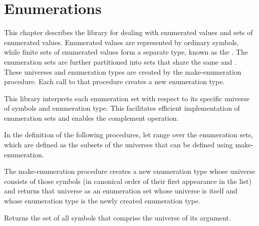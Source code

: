 \chapter{Enumerations}
\label{enumerationschapter}

This chapter describes the  library for dealing with enumerated values
and sets of enumerated values.  Enumerated
values are represented by ordinary symbols, while finite sets of
enumerated values form a separate type, known as the
.
The enumeration sets are further partitioned into sets that
share the same  and .
These universes and enumeration types are created by the
{\cf make-enumeration} procedure.  Each call to that procedure
creates a new enumeration type.

This library interprets each enumeration set with respect to
its specific universe of symbols and enumeration type.
This facilitates efficient implementation of enumeration sets
and enables the complement operation.

In the definition of the following procedures, let 
range over the enumeration sets, which are defined as the subsets
of the universes that can be defined using {\cf make-enumeration}.

\begin{entry}{%
}

The {\cf make-enumeration} procedure
creates a new enumeration type whose universe consists of
those symbols (in canonical order of their first appearance
in the list) and returns that universe as an enumeration
set whose universe is itself and whose enumeration type is
the newly created enumeration type.
\end{entry}

\begin{entry}{%
}

Returns the set of all symbols that comprise
the universe of its argument.
\end{entry}

